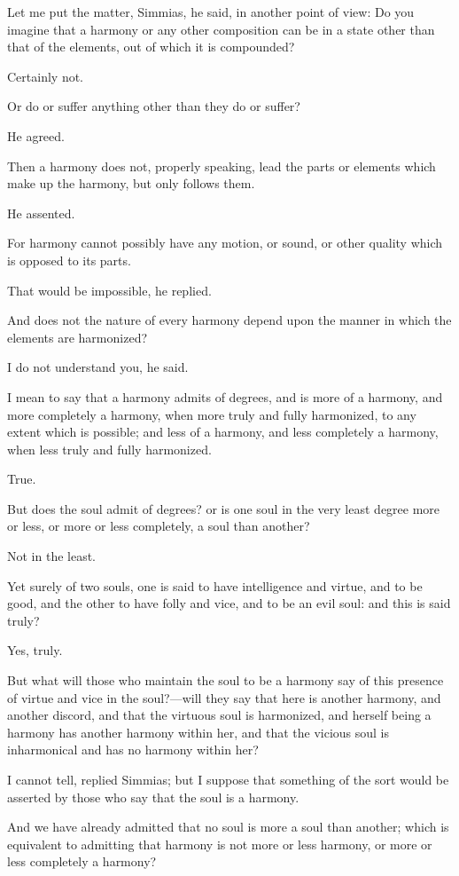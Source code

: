 Let me put the matter, Simmias, he said, in another point of view: Do you
imagine that a harmony or any other composition can be in a state other
than that of the elements, out of which it is compounded?

Certainly not.

Or do or suffer anything other than they do or suffer?

He agreed.

Then a harmony does not, properly speaking, lead the parts or elements
which make up the harmony, but only follows them.

He assented.

For harmony cannot possibly have any motion, or sound, or other quality
which is opposed to its parts.

That would be impossible, he replied.

And does not the nature of every harmony depend upon the manner in which
the elements are harmonized?

I do not understand you, he said.

I mean to say that a harmony admits of degrees, and is more of a harmony,
and more completely a harmony, when more truly and fully harmonized, to
any extent which is possible; and less of a harmony, and less completely a
harmony, when less truly and fully harmonized.

True.

But does the soul admit of degrees? or is one soul in the very least
degree more or less, or more or less completely, a soul than another?

Not in the least.

Yet surely of two souls, one is said to have intelligence and virtue, and
to be good, and the other to have folly and vice, and to be an evil soul:
and this is said truly?

Yes, truly.

But what will those who maintain the soul to be a harmony say of this
presence of virtue and vice in the soul?—will they say that here is
another harmony, and another discord, and that the virtuous soul is
harmonized, and herself being a harmony has another harmony within her,
and that the vicious soul is inharmonical and has no harmony within her?

I cannot tell, replied Simmias; but I suppose that something of the sort
would be asserted by those who say that the soul is a harmony.

And we have already admitted that no soul is more a soul than another;
which is equivalent to admitting that harmony is not more or less harmony,
or more or less completely a harmony?

